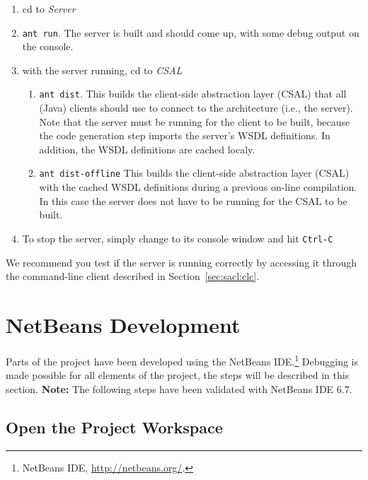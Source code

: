 \begin{enumerate}
  \item cd to \emph{Server}

  \item \texttt{ant run}. The server is built and should come up, with
    some debug output on the console.

  \item with the server running, cd to \emph{CSAL}

    \begin{enumerate}
    \item \texttt{ant dist}. This builds the client-side abstraction
      layer (CSAL) that all (Java) clients should use to connect to
      the architecture (i.e., the server). Note that the server must
      be running for the client to be built, because the code
      generation step imports the server's WSDL definitions. In
      addition, the WSDL definitions are cached localy.
      
      \item \texttt{ant dist-offline} This builds the client-side
      abstraction layer (CSAL) with the cached WSDL definitions during
      a previous on-line compilation.  In this case the server does
      not have to be running for the CSAL to be built.
    \end{enumerate}
    
  \item To stop the server, simply change to its console window and
    hit \texttt{Ctrl-C}
\end{enumerate}
We recommend you test if the server is running correctly by accessing
it through the command-line client described in Section~\ref{sec:sacl:clc}.


\section{NetBeans Development}
Parts of the project have been developed using the NetBeans
IDE.\footnote{NetBeans IDE, \url{http://netbeans.org/}.} Debugging is
  made possible for all elements of the project, the steps will be
  described in this section. \textbf{Note:} The following steps have
  been validated with NetBeans IDE 6.7.

\subsection{Open the Project Workspace}

